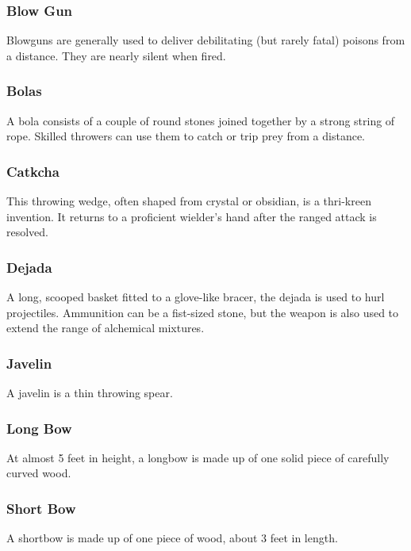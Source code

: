 \begin{multicols}{2}

\subsubsection{Blow Gun}
\label{itmrng:blowgun}
Blowguns are generally used to deliver debilitating (but rarely fatal) poisons from a distance. They are nearly silent when fired.

\subsubsection{Bolas}
\label{itmrng:bolas}
A bola consists of a couple of round stones joined together by a strong string of rope. Skilled throwers can use them to catch or trip prey from a distance.

\subsubsection{Catkcha}
\label{itmrng:catkcha}
This throwing wedge, often shaped from crystal or obsidian, is a thri-kreen invention. It returns to a proficient wielder’s hand after the ranged attack is resolved.

\subsubsection{Dejada}
\label{itmrng:dejada}
A long, scooped basket fitted to a glove-like bracer, the dejada is used to hurl projectiles. Ammunition can be a fist-sized stone, but the weapon is also used to extend the range of alchemical mixtures.

\subsubsection{Javelin}
\label{itmrng:javelin}
A javelin is a thin throwing spear.

\subsubsection{Long Bow}
\label{itmrng:longbow}
At almost 5 feet in height, a longbow is made up of one solid piece of carefully curved wood.

\subsubsection{Short Bow}
\label{itmrng:shortbow}
A shortbow is made up of one piece of wood, about 3 feet in length.

\end{multicols}
